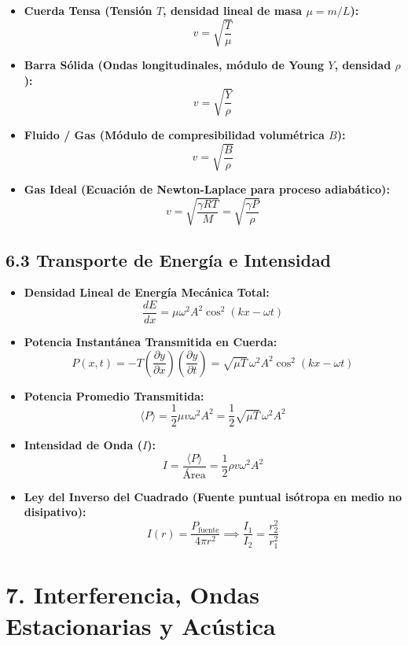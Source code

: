 \documentclass[11pt,a4paper]{article}
\begin{document}
\begin{itemize}
  \item \textbf{Cuerda Tensa (Tensión $T$, densidad lineal de masa $\mu = m/L$):}
  \[
    v = \sqrt{\frac{T}{\mu}}
  \]
  \item \textbf{Barra Sólida (Ondas longitudinales, módulo de Young $Y$, densidad $\rho$):}
  \[
    v = \sqrt{\frac{Y}{\rho}}
  \]
  \item \textbf{Fluido / Gas (Módulo de compresibilidad volumétrica $B$):}
  \[
    v = \sqrt{\frac{B}{\rho}}
  \]
  \item \textbf{Gas Ideal (Ecuación de Newton-Laplace para proceso adiabático):}
  \[
    v = \sqrt{\frac{\gamma R T}{M}} = \sqrt{\frac{\gamma P}{\rho}}
  \]
\end{itemize}

\subsection*{6.3 Transporte de Energía e Intensidad}

\begin{itemize}
  \item \textbf{Densidad Lineal de Energía Mecánica Total:}
  \[
    \frac{dE}{dx} = \mu \omega^2 A^2 \cos^2(kx - \omega t)
  \]
  \item \textbf{Potencia Instantánea Transmitida en Cuerda:}
  \[
    P(x, t) = -T \left( \frac{\partial y}{\partial x} \right) \left( \frac{\partial y}{\partial t} \right) = \sqrt{\mu T} \, \omega^2 A^2 \cos^2(kx - \omega t)
  \]
  \item \textbf{Potencia Promedio Transmitida:}
  \[
    \langle P \rangle = \frac{1}{2} \mu v \omega^2 A^2 = \frac{1}{2} \sqrt{\mu T} \, \omega^2 A^2
  \]
  \item \textbf{Intensidad de Onda ($I$):}
  \[
    I = \frac{\langle P \rangle}{\text{Área}} = \frac{1}{2} \rho v \omega^2 A^2
  \]
  \item \textbf{Ley del Inverso del Cuadrado (Fuente puntual isótropa en medio no disipativo):}
  \[
    I(r) = \frac{P_{\text{fuente}}}{4\pi r^2} \implies \frac{I_1}{I_2} = \frac{r_2^2}{r_1^2}
  \]
\end{itemize}

\section*{7. Interferencia, Ondas Estacionarias y Acústica}
\end{document}
